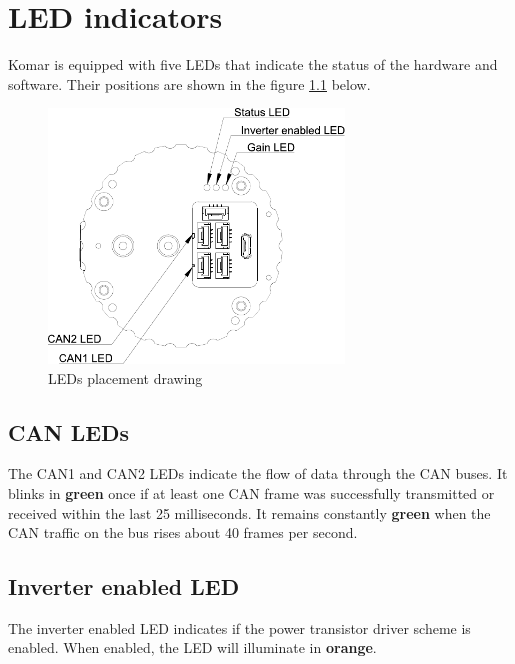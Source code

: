 
\chapter{LED indicators}

\newcommand{\LEDX}{{\rule{0.4em}{1.0em}}}
\newcommand{\LEDO}{{\rule{0.4em}{0.1em}}}

\newcommand{\ShowColor}[1]{{\color{#1}\rule{2em}{0.8em}}}

Komar is equipped with five LEDs that indicate the status of the hardware and software.
Their positions are shown in the figure \ref{fig:characteristics_leds_placement} below.

\begin{figure}[!hbt]
    \centering
    \includegraphics[width=0.7\textwidth]{figures/leds_placement}
    \caption{LEDs placement drawing\label{fig:characteristics_leds_placement}}
\end{figure}

\section{CAN LEDs}
The CAN1 and CAN2 LEDs indicate the flow of data through the CAN buses. It blinks in \textbf{green} once if
at least one CAN frame was successfully transmitted or received within the last 25 milliseconds. It
remains constantly \textbf{green} when the CAN traffic on the bus rises about 40 frames per second.

\section{Inverter enabled LED}
The inverter enabled LED indicates if the power transistor driver scheme is enabled. When enabled, the LED
will illuminate in \textbf{orange}.

